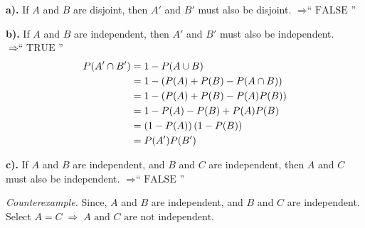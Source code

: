 \documentclass[a4paper, 10pt]{article}
\begin{document}
\begin{solution}
	\par\noindent\textbf{a).} If \(A\) and \(B\) are disjoint, then \(A'\) and \(B'\) must also be disjoint. \(\Rightarrow \boxed{\text{`` FALSE ''}}\)
	\begin{center}
	\end{center}

	\par\noindent\textbf{b).} If \(A\) and \(B\) are independent, then \(A'\) and \(B'\) must also be independent.  \(\Rightarrow \boxed{\text{`` TRUE ''}}\)
	\proof
	\begin{align*}
		P(A' \cap B') & = 1 - P(A \cup B)                  \\
		              & = 1 - (P(A) + P(B) - P(A \cap B))  \\
		              & = 1 - (P(A) + P(B) - P(A)P(B))     \\
		              & = 1 - P(A) - P(B) + P(A)P(B)       \\
		              & = \left(1 - P(A)\right)\left(1 - P(B)\right) \\
		              & = P(A')P(B')
	\end{align*}

	\par\noindent\textbf{c).} If \(A\) and \(B\) are independent, and \(B\) and \(C\) are independent, then \(A\) and \(C\) must also be independent.  \(\Rightarrow \boxed{\text{`` FALSE ''}}\)
	\vspace{2mm}
	\par\textit{Counterexample.}
	Since, \(A\) and \(B\) are independent, and \(B\) and \(C\) are independent. \\
	Select \(A = C \; \Rightarrow \; \boxed{A \text{ and } C \text{ are not independent}} \).

\end{solution}
\end{document}
